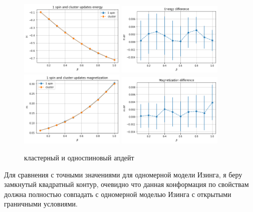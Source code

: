 \begin{figure}[H]
	\centering
	\includegraphics[width = 0.45\textwidth]{../images/1spin_&_cluster_ene.png} 
	\includegraphics[width = 0.45\textwidth]{../images/1spin_&_cluster_ene_dif.png} 
	\includegraphics[width = 0.45\textwidth]{../images/1spin_&_cluster_mag.png} 
	\includegraphics[width = 0.45\textwidth]{../images/1spin_&_cluster_mag_dif.png} 
	\caption{кластерный и односпиновый апдейт}
\end{figure}

Для сравнения с точными значениями для одномерной модели Изинга, я беру замкнутый квадратный контур, очевидно что данная конформация по свойствам должна полностью совпадать с одномерной моделью Изинга с открытыми граничными условиями.

